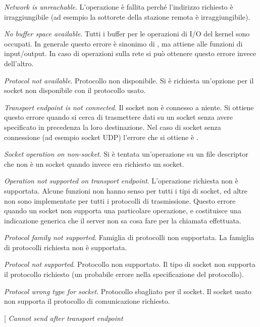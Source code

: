 \begin{basedescript}{\desclabelwidth{1.5cm}\desclabelstyle{\nextlinelabel}}
\item[\errcode{ENETUNREACH} \textit{Network is unreachable}.] L'operazione è
  fallita perché l'indirizzo richiesto è irraggiungibile (ad esempio la
  sottorete della stazione remota è irraggiungibile).
\item[\errcode{ENOBUFS} \textit{No buffer space available}.] Tutti i buffer per
  le operazioni di I/O del kernel sono occupati. In generale questo errore è
  sinonimo di , ma attiene alle funzioni di input/output. In
  caso di operazioni sulla rete si può ottenere questo errore invece
  dell'altro.
\item[\errcode{ENOPROTOOPT} \textit{Protocol not available}.] Protocollo non
  disponibile. Si è richiesta un'opzione per il socket non disponibile con il
  protocollo usato.
\item[\errcode{ENOTCONN} \textit{Transport endpoint is not connected}.] Il
  socket non è connesso a niente. Si ottiene questo errore quando si cerca di
  trasmettere dati su un socket senza avere specificato in precedenza la loro
  destinazione. Nel caso di socket senza connessione (ad esempio socket UDP)
  l'errore che si ottiene è .
\item[\errcode{ENOTSOCK} \textit{Socket operation on non-socket}.] Si è
  tentata un'operazione su un file descriptor che non è un socket quando
  invece era richiesto un socket.
\item[\errcode{EOPNOTSUPP} \textit{Operation not supported on transport
    endpoint}.] L'operazione richiesta non è supportata. Alcune funzioni non
  hanno senso per tutti i tipi di socket, ed altre non sono implementate per
  tutti i protocolli di trasmissione. Questo errore quando un socket non
  supporta una particolare operazione, e costituisce una indicazione generica
  che il server non sa cosa fare per la chiamata effettuata.
\item[\errcode{EPFNOSUPPORT} \textit{Protocol family not supported}.] Famiglia
  di protocolli non supportata. La famiglia di protocolli richiesta non è
  supportata.
\item[\errcode{EPROTONOSUPPORT} \textit{Protocol not supported}.] Protocollo
  non supportato. Il tipo di socket non supporta il protocollo richiesto (un
  probabile errore nella specificazione del protocollo).
\item[\errcode{EPROTOTYPE} \textit{Protocol wrong type for socket}.]
  Protocollo sbagliato per il socket. Il socket usato non supporta il
  protocollo di comunicazione richiesto.
\item[ \textit{Cannot send after transport endpoint
}
\end{basedescript}
